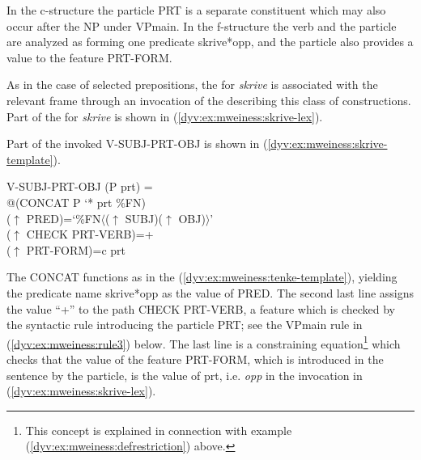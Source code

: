 \documentclass[output=paper]{langsci/langscibook}
\begin{document}
In the c-structure the particle \textsf{PRT} is a separate constituent which may also occur after the \textsf{NP} under \textsf{VPmain}.
In the f-structure the verb and the particle are analyzed as forming one predicate \textsf{skrive*opp}, and the particle also provides a value to the feature \textsf{PRT-FORM}.

As in the case of selected prepositions, the  for \textit{skrive} is associated with the relevant frame through an invocation of the  describing this class of constructions.
Part of the  for \textit{skrive} is shown in  (\ref{dyv:ex:mweiness:skrive-lex}).


Part of the invoked  \textsf{V-SUBJ-PRT-OBJ} is shown in  (\ref{dyv:ex:mweiness:skrive-template}).

\ea\label{dyv:ex:mweiness:skrive-template}
{\sffamily 
V-SUBJ-PRT-OBJ (P prt) =\\
\hspace{2em} @(CONCAT P `* prt \%FN)\\
\hspace{2em}  ($\uparrow$ PRED)=`\%FN$\langle$($\uparrow$ SUBJ)($\uparrow$ OBJ)$\rangle$'\\
\hspace{2em}  ($\uparrow$ CHECK PRT-VERB)=+\\
\hspace{2em}  ($\uparrow$ PRT-FORM)=c prt
}
\z

The \textsf{CONCAT}  functions as in the  (\ref{dyv:ex:mweiness:tenke-template}), yielding the  predicate name \textsf{skrive*opp} as the value of \textsf{PRED}.
The second last line assigns the value ``\textsf{+}'' to the path \textsf{CHECK PRT-VERB}, a feature which is checked by the syntactic rule introducing the particle \textsf{PRT}; see the \textsf{VPmain} rule in (\ref{dyv:ex:mweiness:rule3}) below.
The last line is a constraining equation\footnote{This concept is explained in connection with example (\ref{dyv:ex:mweiness:defrestriction}) above.} which checks that the value of the feature \textsf{PRT-FORM}, which is introduced in the sentence by the particle, is the value of \textsf{prt}, i.e. \emph{opp} in the  invocation in (\ref{dyv:ex:mweiness:skrive-lex}).
\end{document}
